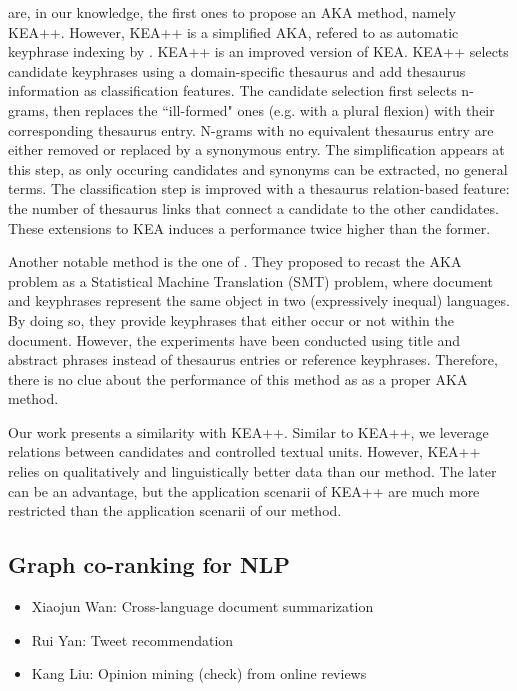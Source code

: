      are, in our knowledge, the first ones
    to propose an AKA method, namely KEA++. However, KEA++ is a simplified AKA,
    refered to as automatic keyphrase indexing by
    . KEA++ is an improved version of KEA.
    KEA++ selects candidate keyphrases using a domain-specific thesaurus and add
    thesaurus information as classification features. The candidate selection
    first selects n-grams, then replaces the ``ill-formed" ones (e.g. with a
    plural flexion) with their corresponding thesaurus entry. N-grams with no
    equivalent thesaurus entry are either removed or replaced by a synonymous
    entry. The simplification appears at this step, as only occuring candidates
    and synonyms can be extracted, no general terms. The classification step is
    improved with a thesaurus relation-based feature: the number of thesaurus
    links that connect a candidate to the other candidates. These extensions to
    KEA induces a performance twice higher than the former.

    Another notable method is the one of . They
    proposed to recast the AKA problem as a Statistical Machine Translation
    (SMT) problem, where document and keyphrases represent the same object in
    two (expressively inequal) languages. By doing so, they provide keyphrases
    that either occur or not within the document. However, the experiments have
    been conducted using title and abstract phrases instead of thesaurus entries
    or reference keyphrases. Therefore, there is no clue about the performance
    of this method as as a proper AKA method.

    Our work presents a similarity with KEA++. Similar to KEA++, we leverage
    relations between candidates and controlled textual units. However, KEA++
    relies on qualitatively and linguistically better data than our method. The
    later can be an advantage, but the application scenarii of KEA++ are much
    more restricted than the application scenarii of our method.

  \subsection{Graph co-ranking for NLP}
  \label{subsec:graph_co_ranking_for_nlp}
    \begin{itemize}
      \item{Xiaojun Wan: Cross-language document summarization}
      \item{Rui Yan: Tweet recommendation}
      \item{Kang Liu: Opinion mining (check) from online reviews}
    \end{itemize}

